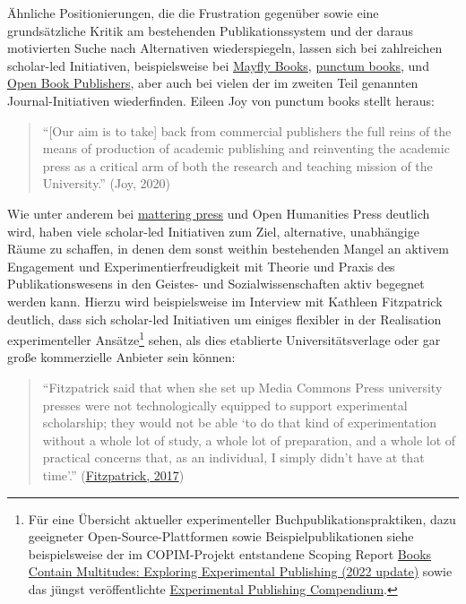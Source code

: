 \documentclass[a4paper,
fontsize=11pt,
oneside,
numbers=noperiodatend,
parskip=half-,
bibliography=totoc,
final
]{scrartcl}
\begin{document}
Ähnliche Positionierungen, die die Frustration gegenüber sowie eine
grundsätzliche Kritik am bestehenden Publikationssystem und der daraus
motivierten Suche nach Alternativen wiederspiegeln, lassen sich bei
zahlreichen scholar-led Initiativen, beispielsweise bei
\href{https://mayflybooks.org/about/}{Mayfly Books},
\href{https://punctumbooks.com/about/vision-statement/}{punctum books},
und
\href{https://blogs.openbookpublishers.com/ten-years-of-obp-an-interview-with-alessandra-tosi-and-rupert-gatti/}{Open
Book Publishers}, aber auch bei vielen der im zweiten Teil genannten
Journal-Initiativen wiederfinden. Eileen Joy von punctum books stellt
heraus:

\begin{quote}
\enquote{{[}Our aim is to take{]} back from commercial publishers the
full reins of the means of production of academic publishing and
reinventing the academic press as a critical arm of both the research
and teaching mission of the University.} (Joy, 2020)
\end{quote}

Wie unter anderem bei
\href{https://twitter.com/hardyjuls/status/1314347568185462786}{mattering
press} und Open Humanities Press deutlich wird, haben viele scholar-led
Initiativen zum Ziel, alternative, unabhängige Räume zu schaffen, in
denen dem sonst weithin bestehenden Mangel an aktivem Engagement und
Experimentierfreudigkeit mit Theorie und Praxis des Publikationswesens
in den Geistes- und Sozialwissenschaften aktiv begegnet werden kann.
Hierzu wird beispielsweise im Interview mit Kathleen Fitzpatrick
deutlich, dass sich scholar-led Initiativen um einiges flexibler in der
Realisation experimenteller Ansätze\footnote{Für eine Übersicht
  aktueller experimenteller Buchpublikationspraktiken, dazu geeigneter
  Open-Source-Plattformen sowie Beispielpublikationen siehe
  beispielsweise der im COPIM-Projekt entstandene Scoping Report
  \href{https://doi.org/10.21428/785a6451.1792b84f}{Books Contain
  Multitudes: Exploring Experimental Publishing (2022 update)} sowie das
  jüngst veröffentlichte
  \href{https://compendium.copim.ac.uk}{Experimental Publishing
  Compendium}.} sehen, als dies etablierte Universitätsverlage oder gar
große kommerzielle Anbieter sein können:

\begin{quote}
\enquote{Fitzpatrick said that when she set up Media Commons Press
university presses were not technologically equipped to support
experimental scholarship; they would not be able \enquote*{to do that
kind of experimentation without a whole lot of study, a whole lot of
preparation, and a whole lot of practical concerns that, as an
individual, I simply didn't have at that time}.}
(\href{https://repository.jisc.ac.uk/6666/1/Changing-publishing-ecologies-report.pdf}{Fitzpatrick,
2017})
\end{quote}
\end{document}
